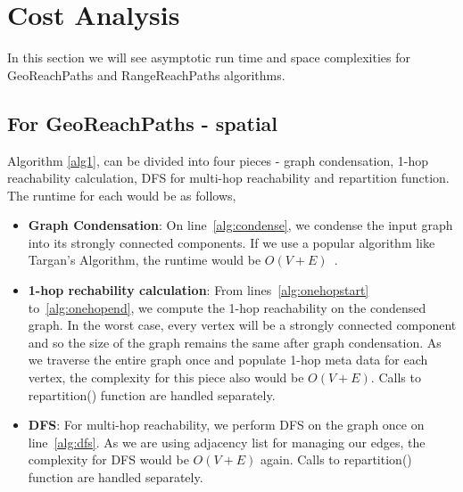 \section{Cost Analysis} \label{sec:costanalysis}

In this section we will see asymptotic run time and space complexities for GeoReachPaths and RangeReachPaths algorithms.

\subsection{For GeoReachPaths - spatial}
Algorithm \ref{alg1}, can be divided into four pieces - graph condensation, 1-hop reachability calculation, DFS for multi-hop reachability and repartition function. The runtime for each would be as follows,
\begin{itemize}

  \item \textbf{Graph Condensation}: On line~\ref{alg:condense}, we condense the input graph into its strongly connected components. If we use a popular algorithm like Targan's Algorithm, the runtime would be $O(V + E)$~\cite{R1972}.

  \item \textbf{1-hop rechability calculation}: From lines~\ref{alg:onehopstart} to~\ref{alg:onehopend}, we compute the 1-hop reachability on the condensed graph. In the worst case, every vertex will be a strongly connected component and so the size of the graph remains the same after graph condensation. As we traverse the entire graph once and populate 1-hop meta data for each vertex, the complexity for this piece also would be $O(V + E)$. Calls to repartition() function are handled separately.

  \item \textbf{DFS}: For multi-hop reachability, we perform DFS on the graph once on line~\ref{alg:dfs}. As we are using adjacency list for managing our edges, the complexity for DFS would be $O(V + E)$ again. Calls to repartition() function are handled separately.


\end{itemize}
